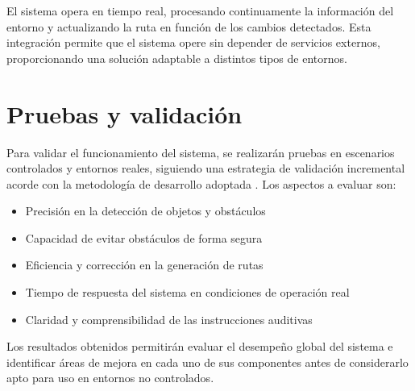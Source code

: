 El sistema opera en tiempo real, procesando continuamente la información del entorno y actualizando la ruta en función de los cambios detectados. Esta integración permite que el sistema opere sin depender de servicios externos, proporcionando una solución adaptable a distintos tipos de entornos.

\section{Pruebas y validación}

Para validar el funcionamiento del sistema, se realizarán pruebas en escenarios controlados y entornos reales, siguiendo una estrategia de validación incremental acorde con la metodología de desarrollo adoptada \cite{sommerville2011software}. Los aspectos a evaluar son:

\begin{itemize}
    \item Precisión en la detección de objetos y obstáculos
    \item Capacidad de evitar obstáculos de forma segura
    \item Eficiencia y corrección en la generación de rutas
    \item Tiempo de respuesta del sistema en condiciones de operación real
    \item Claridad y comprensibilidad de las instrucciones auditivas
\end{itemize}

Los resultados obtenidos permitirán evaluar el desempeño global del sistema e identificar áreas de mejora en cada uno de sus componentes antes de considerarlo apto para uso en entornos no controlados.